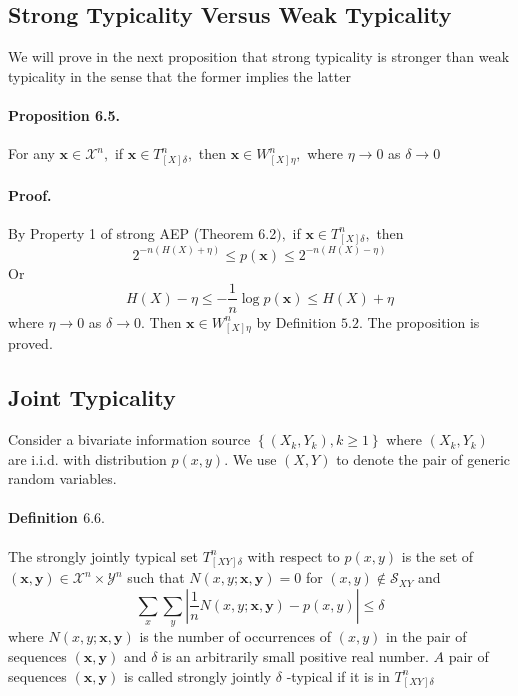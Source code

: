 \documentclass[8pt]{article}
\begin{document}
\subsection{Strong Typicality Versus Weak Typicality}
We will prove in the next proposition that strong typicality is
stronger than weak typicality in the sense that the former implies the latter
\begin{tcolorbox}
\paragraph{Proposition 6.5.} For any $\mathbf{x} \in \mathcal{X}^{n},$ if $\mathbf{x} \in T_{[X] \delta}^{n},$ then $\mathbf{x} \in W_{[X] \eta}^{n},$ where $\eta \rightarrow 0$ as $\delta \rightarrow 0$
\end{tcolorbox}

\paragraph{Proof.} By Property 1 of strong AEP (Theorem 6.2$),$ if $\mathbf{x} \in T_{[X] \delta}^{n},$ then
$$
2^{-n(H(X)+\eta)} \leq p(\mathbf{x}) \leq 2^{-n(H(X)-\eta)}
$$
Or
$$
H(X)-\eta \leq-\frac{1}{n} \log p(\mathbf{x}) \leq H(X)+\eta
$$
where $\eta \rightarrow 0$ as $\delta \rightarrow 0 .$ Then $\mathbf{x} \in W_{[X] \eta}^{n}$ by Definition $5.2 .$ The proposition is proved.

\subsection{Joint Typicality}
Consider a bivariate information source $\left\{\left(X_{k}, Y_{k}\right), k \geq 1\right\}$ where $\left(X_{k}, Y_{k}\right)$ are i.i.d. with distribution $p(x, y) .$ We use $(X, Y)$ to denote the pair of generic random variables.
\begin{tcolorbox}
\paragraph{Definition $6.6 .$} The strongly jointly typical set $T_{[X Y] \delta}^{n}$ with respect to $p(x, y)$ is the set of $(\mathbf{x}, \mathbf{y}) \in \mathcal{X}^{n} \times \mathcal{Y}^{n}$ such that $N(x, y ; \mathbf{x}, \mathbf{y})=0$ for $(x, y) \notin \mathcal{S}_{X Y}$
and
$$
\sum_{x} \sum_{y}\left|\frac{1}{n} N(x, y ; \mathbf{x}, \mathbf{y})-p(x, y)\right| \leq \delta
$$
where $N(x, y ; \mathbf{x}, \mathbf{y})$ is the number of occurrences of $(x, y)$ in the pair of sequences $(\mathbf{x}, \mathbf{y})$ and $\delta$ is an arbitrarily small positive real number. $A$ pair of sequences $(\mathbf{x}, \mathbf{y})$ is called strongly jointly $\delta$ -typical if it is in $T_{[X Y] \delta}^{n}$
\end{tcolorbox}
\end{document}
